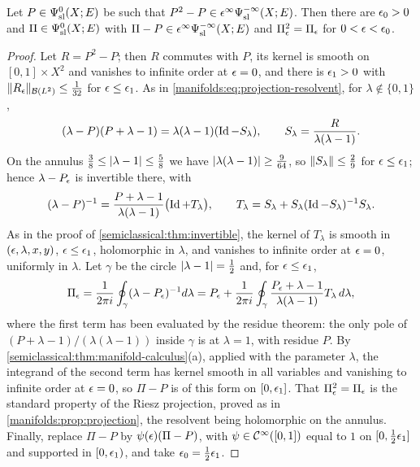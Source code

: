 \begin{lemma}\label{semiclassical:lem:riesz}
  Let $P\in\Psi^{0}_{\mathrm{sl}}(X;E)$ be such that $P^2-P\in\epsilon^\infty\Psi^{-\infty}_{\mathrm{sl}}(X;E)$. Then there
  are $\epsilon_0>0$ and $\Pi\in\Psi^{0}_{\mathrm{sl}}(X;E)$ with $\Pi-P\in\epsilon^\infty\Psi^{-\infty}_{\mathrm{sl}}(X;E)$
  and $\Pi_\epsilon^2=\Pi_\epsilon$ for $0<\epsilon<\epsilon_0$.
\end{lemma}
\begin{proof}
  Let $R=P^2-P$; then $R$ commutes with $P$, its kernel is smooth on
  $[0,1]\times X^2$ and vanishes to infinite order at $\epsilon=0$, and there is
  $\epsilon_1>0$ with $\lVert R_\epsilon\rVert_{\mathcal{B}(L^2)}\le\frac1{32}$ for $\epsilon\le\epsilon_1$. As in
  \eqref{manifolds:eq:projection-resolvent}, for $\lambda\notin\{0,1\}$,
  \begin{equation*}
    (\lambda-P)(P+\lambda-1)=\lambda(\lambda-1)(\operatorname{Id}-S_\lambda),\qquad S_\lambda=\frac{R}{\lambda(\lambda-1)}.
  \end{equation*}
  On the annulus $\frac38\le\lvert \lambda-1\rvert\le\frac58$ we have
  $\lvert \lambda(\lambda-1)\rvert\ge\frac9{64}$, so $\lVert S_\lambda\rVert\le\frac{2}{9}$ for
  $\epsilon\le\epsilon_1$; hence $\lambda-P_\epsilon$ is invertible there, with
  \begin{equation*}
    (\lambda-P)^{-1}=\frac{P+\lambda-1}{\lambda(\lambda-1)}\bigl(\operatorname{Id}+T_\lambda\bigr),\qquad
    T_\lambda=S_\lambda+S_\lambda(\operatorname{Id}-S_\lambda)^{-1}S_\lambda .
  \end{equation*}
  As in the proof of \cref{semiclassical:thm:invertible}, the kernel of $T_\lambda$
  is smooth in $(\epsilon,\lambda,x,y)$, $\epsilon\le\epsilon_1$, holomorphic in $\lambda$, and
  vanishes to infinite order at $\epsilon=0$, uniformly in $\lambda$. Let $\gamma$ be the circle
  $\lvert \lambda-1\rvert=\frac12$ and, for $\epsilon\le\epsilon_1$,
  \begin{equation*}
    \Pi_\epsilon=\frac1{2\pi i}\oint_\gamma(\lambda-P_\epsilon)^{-1}d\lambda
    =P_\epsilon+\frac1{2\pi i}\oint_\gamma\frac{P_\epsilon+\lambda-1}{\lambda(\lambda-1)}T_\lambda\,d\lambda,
  \end{equation*}
  where the first term has been evaluated by the residue theorem: the only pole
  of $(P+\lambda-1)/(\lambda(\lambda-1))$ inside $\gamma$ is at $\lambda=1$, with residue $P$. By
  \cref{semiclassical:thm:manifold-calculus}(a), applied with the parameter $\lambda$, the
  integrand of the second term has kernel smooth in all variables and vanishing to
  infinite order at $\epsilon=0$, so $\Pi-P$ is of this form on $[0,\epsilon_1]$. That
  $\Pi_\epsilon^2=\Pi_\epsilon$ is the standard property of the Riesz projection, proved as in
  \cref{manifolds:prop:projection}, the resolvent being holomorphic on the annulus.
  Finally, replace $\Pi-P$ by $\psi(\epsilon)(\Pi-P)$, with $\psi\in\mathcal{C}^\infty([0,1])$ equal to $1$
  on $[0,\frac12\epsilon_1]$ and supported in $[0,\epsilon_1)$, and take $\epsilon_0=\frac12\epsilon_1$.
\end{proof}

